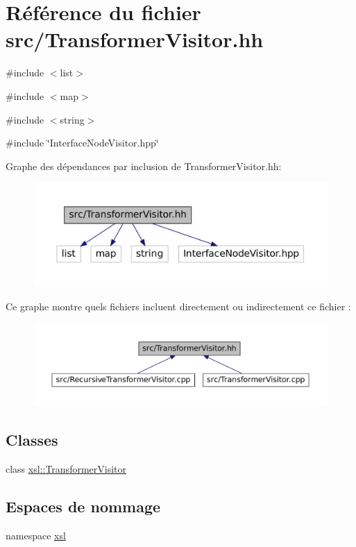 \hypertarget{_transformer_visitor_8hh}{
\section{Référence du fichier src/TransformerVisitor.hh}
\label{_transformer_visitor_8hh}
}
{\ttfamily \#include $<$list$>$}\par
{\ttfamily \#include $<$map$>$}\par
{\ttfamily \#include $<$string$>$}\par
{\ttfamily \#include \char`\"{}InterfaceNodeVisitor.hpp\char`\"{}}\par
Graphe des dépendances par inclusion de TransformerVisitor.hh:
\nopagebreak
\begin{figure}[H]
\begin{center}
\leavevmode
\includegraphics[width=400pt]{_transformer_visitor_8hh__incl}
\end{center}
\end{figure}
Ce graphe montre quels fichiers incluent directement ou indirectement ce fichier :
\nopagebreak
\begin{figure}[H]
\begin{center}
\leavevmode
\includegraphics[width=400pt]{_transformer_visitor_8hh__dep__incl}
\end{center}
\end{figure}
\subsection*{Classes}
\begin{DoxyCompactItemize}
\item 
class \hyperlink{classxsl_1_1_transformer_visitor}{xsl::TransformerVisitor}
\end{DoxyCompactItemize}
\subsection*{Espaces de nommage}
\begin{DoxyCompactItemize}
\item 
namespace \hyperlink{namespacexsl}{xsl}
\end{DoxyCompactItemize}
